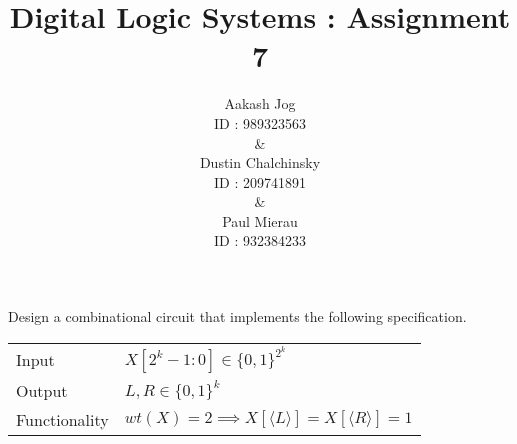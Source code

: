 \documentclass[fleqn, a4paper, 11pt, oneside]{amsart}
\title{Digital Logic Systems : Assignment 7}
\author{
	Aakash Jog\\
	ID : 989323563\\
	\&\\
	Dustin Chalchinsky\\
	ID : 209741891\\
	\&\\
	Paul Mierau\\
	ID : 932384233
	}
\date{\formatdate{7}{6}{2015}}
\theoremstyle{definition}
\theoremstyle{theorem}
\theoremstyle{remark}
\begin{document}
	
\maketitle

\begin{question}
	Design a combinational circuit that implements the following specification.
	\begin{tabular}{l l}
		        Input & $X[2^k - 1 : 0] \in \{0,1\}^{2^k}$                                                             \\
		       Output & $L, R \in \{0,1\}^k$                                                                           \\
		Functionality & $wt(X) = 2 \implies X\left[ \langle L \rangle \right] = X\left[ \langle R \rangle \right] = 1$ \\
	\end{tabular}
\end{question}

\def\demux#1#2{
	\begin{scope}[shift = {#1}, rotate = {#2}]
		\draw (-0.5,0.5) -- (-0.5,-0.5) -- (0.5,-1) -- (0.5,1) -- cycle;

		\draw (-0.5,0) -- (-1,0);

		\draw (0.5,0.5) -- (1,0.5);
		\draw (0.5,-0.5) -- (1,-0.5);

		\draw (0,-0.75) -- (0,-1);

		\node [left] at (0.5,0.5) {\tiny{$0$}};
		\node [left] at (0.5,-0.5) {\tiny{$1$}};
	\end{scope}
}

\def\JO#1#2#3{
	\begin{scope}[shift = {#1}, rotate = {#2}]
		\draw (-1,-1) rectangle (1,1);

		\draw (-1,0) -- (-2,0);

		\draw (1,0.5) -- (2,0.5);
		\draw (1,-0.5) -- (2,-0.5);

		\node [left] at (1,0.5) {\tiny{$y$}};
		\node [left] at (1,-0.5) {\tiny{$z$}};
		\node at (0,0) {$JO(${#3}$)$};
	\end{scope}
}
\end{document}
